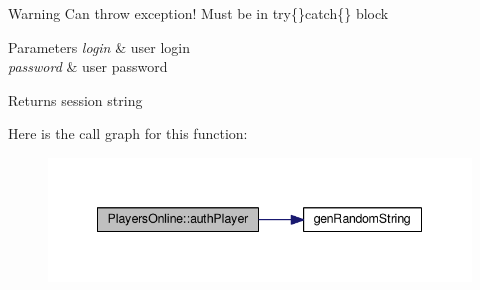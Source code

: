 \begin{DoxyWarning}{Warning}
Can throw exception! Must be in try\{\}catch\{\} block 
\end{DoxyWarning}

\begin{DoxyParams}{Parameters}
{\em login} & user login \\
\hline
{\em password} & user password \\
\hline
\end{DoxyParams}
\begin{DoxyReturn}{Returns}
session string 
\end{DoxyReturn}


Here is the call graph for this function\-:
\nopagebreak
\begin{figure}[H]
\begin{center}
\leavevmode
\includegraphics[width=342pt]{class_players_online_a5b778414970f89fa01e999c9200c7001_cgraph}
\end{center}
\end{figure}


